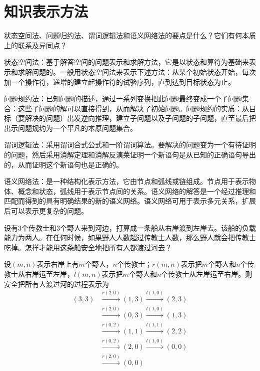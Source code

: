 \chapter{知识表示方法}

\begin{question}
状态空间法、问题归约法、谓词逻辑法和语义网络法的要点是什么？它们有何本质上的联系及异同点？
\end{question}	
\begin{solution}
状态空间法：基于解答空间的问题表示和求解方法，它是以状态和算符为基础来表示和求解问题的。一般用状态空间法来表示下述方法：从某个初始状态开始，每次加一个操作符，递增的建立起操作符的试验序列，直到达到目标状态为止。 \par
问题规约法：已知问题的描述，通过一系列变换把此问题最终变成一个子问题集合：这些子问题的解可以直接得到，从而解决了初始问题。问题规约的实质：从目标（要解决的问题）出发逆向推理，建立子问题以及子问题的子问题，直至最后把出示问题规约为一个平凡的本原问题集合。 \par
谓词逻辑法：采用谓词合式公式和一阶谓词算法。要解决的问题变为一个有待证明的问题，然后采用消解定理和消解反演莱证明一个新语句是从已知的正确语句导出的，从而证明这个新语句也是正确的。\par
语义网络法：是一种结构化表示方法，它由节点和弧线或链组成。节点用于表示物体、概念和状态，弧线用于表示节点间的关系。语义网络的解答是一个经过推理和匹配而得到的具有明确结果的新的语义网络。语义网络可用于表示多元关系，扩展后可以表示更复杂的问题。
\end{solution}

\begin{question}
设有$3$个传教士和$3$个野人来到河边，打算成一条船从右岸渡到左岸去。该船的负载能力为两人。在任何时候，如果野人人数超过传教士人数，那么野人就会把传教士吃掉。怎样才能用这条船安全地把所有人都渡过河去？
\end{question}
\begin{solution}
设$(m,n)$表示右岸上有$m$个野人，$n$个传教士；$r(m,n)$表示把$m$个野人和$n$个传教士从右岸运至左岸，$l(m,n)$表示把$m$个野人和$n$个传教士从左岸运至右岸。则安全把所有人渡过河的过程表示为
\begin{align*}
(3,3) & \xrightarrow{r(2,0)} (1,3) \xrightarrow{l(1,0)} (2,3) \\
	& \xrightarrow{r(2,0)} (0,3) \xrightarrow{l(1,0)} (1,3) \\
	& \xrightarrow{r(0,2)} (1,1) \xrightarrow{l(1,1)} (2,2) \\
	& \xrightarrow{r(0,2)} (2,0) \xrightarrow{l(1,0)} (0,0) \\
	& \xrightarrow{r(2,0)} (0,0)
\end{align*}
\end{solution}

